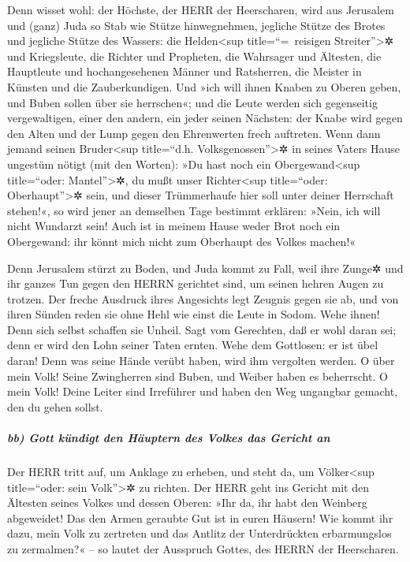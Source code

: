 Denn wisset wohl: der Höchste, der HERR der Heerscharen,
wird aus Jerusalem und (ganz) Juda so Stab wie Stütze hinwegnehmen,
jegliche Stütze des Brotes und jegliche Stütze des Wassers:
die Helden\textless sup title=``=~reisigen
Streiter''\textgreater✲ und Kriegsleute, die Richter und Propheten, die
Wahrsager und Ältesten, die Hauptleute und hochangesehenen
Männer und Ratsherren, die Meister in Künsten und die Zauberkundigen.
Und »ich will ihnen Knaben zu Oberen geben, und Buben
sollen über sie herrschen«; und die Leute werden sich
gegenseitig vergewaltigen, einer den andern, ein jeder seinen Nächsten:
der Knabe wird gegen den Alten und der Lump gegen den Ehrenwerten frech
auftreten. Wenn dann jemand seinen Bruder\textless sup
title=``d.h. Volksgenossen''\textgreater✲ in seines Vaters Hause
ungestüm nötigt (mit den Worten): »Du hast noch ein
Obergewand\textless sup title=``oder: Mantel''\textgreater✲, du mußt
unser Richter\textless sup title=``oder: Oberhaupt''\textgreater✲ sein,
und dieser Trümmerhaufe hier soll unter deiner Herrschaft stehen!«,
so wird jener an demselben Tage bestimmt erklären: »Nein,
ich will nicht Wundarzt sein! Auch ist in meinem Hause weder Brot noch
ein Obergewand: ihr könnt mich nicht zum Oberhaupt des Volkes machen!«

Denn Jerusalem stürzt zu Boden, und Juda kommt zu Fall,
weil ihre Zunge✲ und ihr ganzes Tun gegen den HERRN gerichtet sind, um
seinen hehren Augen zu trotzen. Der freche Ausdruck ihres
Angesichts legt Zeugnis gegen sie ab, und von ihren Sünden reden sie
ohne Hehl wie einst die Leute in Sodom. Wehe ihnen! Denn sich selbst
schaffen sie Unheil. Sagt vom Gerechten, daß er wohl
daran sei; denn er wird den Lohn seiner Taten ernten.
Wehe dem Gottlosen: er ist übel daran! Denn was seine
Hände verübt haben, wird ihm vergolten werden. O über
mein Volk! Seine Zwingherren sind Buben, und Weiber haben es beherrscht.
O mein Volk! Deine Leiter sind Irreführer und haben den Weg ungangbar
gemacht, den du gehen sollst.

\hypertarget{bb-gott-kuxfcndigt-den-huxe4uptern-des-volkes-das-gericht-an}{%
\subparagraph{bb) Gott kündigt den Häuptern des Volkes das Gericht
an}\label{bb-gott-kuxfcndigt-den-huxe4uptern-des-volkes-das-gericht-an}}

Der HERR tritt auf, um Anklage zu erheben, und steht da,
um Völker\textless sup title=``oder: sein Volk''\textgreater✲ zu
richten. Der HERR geht ins Gericht mit den Ältesten
seines Volkes und dessen Oberen: »Ihr da, ihr habt den Weinberg
abgeweidet! Das den Armen geraubte Gut ist in euren Häusern!
Wie kommt ihr dazu, mein Volk zu zertreten und das
Antlitz der Unterdrückten erbarmungslos zu zermalmen?« -- so lautet der
Ausspruch Gottes, des HERRN der Heerscharen.

